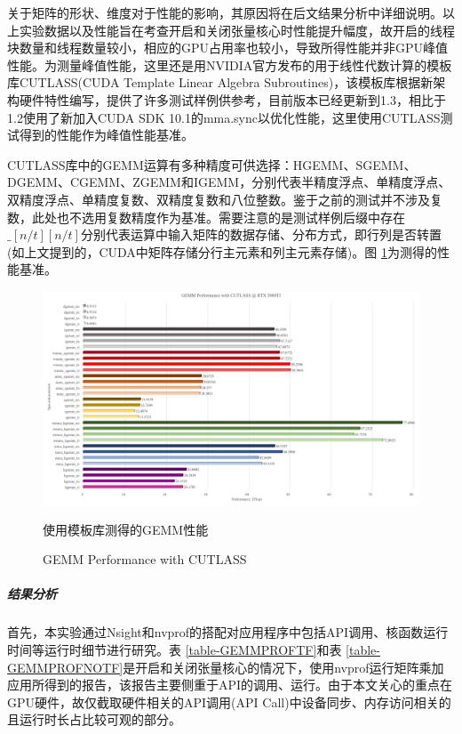 \par 关于矩阵的形状、维度对于性能的影响，其原因将在后文结果分析中详细说明。以上实验数据以及性能旨在考查开启和关闭张量核心时性能提升幅度，故开启的线程块数量和线程数量较小，相应的GPU占用率也较小，导致所得性能并非GPU峰值性能。为测量峰值性能，这里还是用NVIDIA官方发布的用于线性代数计算的模板库CUTLASS(CUDA Template Linear Algebra Subroutines)，该模板库根据新架构硬件特性编写，提供了许多测试样例供参考，目前版本已经更新到1.3，相比于1.2使用了新加入CUDA SDK 10.1的mma.sync以优化性能，这里使用CUTLASS测试得到的性能作为峰值性能基准。
\par CUTLASS库中的GEMM运算有多种精度可供选择：HGEMM、SGEMM、DGEMM、CGEMM、ZGEMM和IGEMM，分别代表半精度浮点、单精度浮点、双精度浮点、单精度复数、双精度复数和八位整数。鉴于之前的测试并不涉及复数，此处也不选用复数精度作为基准。需要注意的是测试样例后缀中存在$ \_[n/t][n/t] $分别代表运算中输入矩阵的数据存储、分布方式，即行列是否转置(如上文提到的，CUDA中矩阵存储分行主元素和列主元素存储)。图 \ref{Fig-GEMM-CUTLASS}为测得的性能基准。
\begin{figure}
	\centering
	\includegraphics[width=15cm]{figures/CUTLASSGEMM.jpg}
	\renewcommand{\thefigure}{\arabic{section}-\arabic{figure} }
	\renewcommand{\figurename}{图}
	\caption{使用模板库测得的GEMM性能}
	\addtocounter{figure}{-1}
	\renewcommand{\thefigure}{\arabic{section}-\arabic{figure} }
	\renewcommand{\figurename}{Figure}
	\caption{GEMM Performance with CUTLASS}
	\label{Fig-GEMM-CUTLASS}
\end{figure}
\subparagraph{结果分析}
\par 首先，本实验通过Nsight和nvprof的搭配对应用程序中包括API调用、核函数运行时间等运行时细节进行研究。表 \ref{table-GEMMPROFTF}和表 \ref{table-GEMMPROFNOTF}是开启和关闭张量核心的情况下，使用nvprof运行矩阵乘加应用所得到的报告，该报告主要侧重于API的调用、运行。由于本文关心的重点在GPU硬件，故仅截取硬件相关的API调用(API Call)中设备同步、内存访问相关的且运行时长占比较可观的部分。
